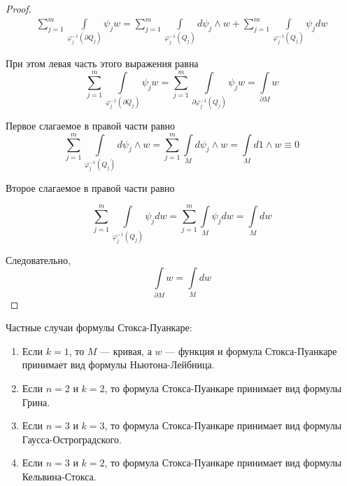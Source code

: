 \documentclass[a5paper]{article}
\theoremstyle{plain}
\theoremstyle{definition}
\numberwithin{through}{section}
\numberwithin{equation}{section}
\begin{document}
\begin{proof}
	\begin{eqnarray}\nonumber
	\sum_{j = 1}^m \int\limits_{\varphi_j^{-1}(\partial Q_j)} \psi_j w = 
	\sum_{j = 1}^m \int\limits_{\varphi_j^{-1}(Q_j)}  d\psi_j \wedge w + 
	\sum_{j=1}^m \int\limits_{\varphi_j^{-1}(Q_j)} \psi_j dw
	\end{eqnarray}
	
	При этом левая часть этого выражения равна
	\begin{equation*}
	\sum_{j = 1}^m \int\limits_{\varphi_j^{-1}(\partial Q_j)} \psi_j w 
	= \sum_{j = 1}^m \int\limits_{\partial\varphi_j^{-1}( Q_j)} \psi_j w
	= \int\limits_{\partial M} w
	\end{equation*} 
	
	Первое слагаемое в правой части равно
	\begin{equation*}
	\sum_{j = 1}^m \int\limits_{\varphi_j^{-1}(Q_j)}  d\psi_j \wedge w
	= \sum_{j = 1}^m \int\limits_{M}  d\psi_j \wedge w 
	= \int\limits_M d1 \wedge w \equiv 0
	\end{equation*}
	
	Второе слагаемое в правой части равно
	
	\begin{equation*}
	\sum_{j=1}^m \int\limits_{\varphi_j^{-1}(Q_j)} \psi_j dw 
	= \sum_{j=1}^m \int\limits_{M} \psi_j dw
	= \int\limits_M dw
	\end{equation*}
	
	Следовательно, 
	\[ \int\limits_{\partial M} w = \int\limits_M dw \]
\end{proof}		

Частные случаи формулы Стокса-Пуанкаре:

\begin{enumerate}
	\item Если $k = 1$, то $M$ --- кривая, а $w$ --- функция и формула Стокса-Пуанкаре принимает вид формулы Ньютона-Лейбница.
	
	\item Если $n = 2$ и $k = 2$, то формула Стокса-Пуанкаре принимает вид формулы Грина.
	
	\item Если $n = 3$ и $k = 3$, то формула Стокса-Пуанкаре принимает вид формулы Гаусса-Остроградского.
	
	\item Если $n = 3$ и $k = 2$, то формула Стокса-Пуанкаре принимает вид формулы Кельвина-Стокса.
\end{enumerate}


	
\end{document}
